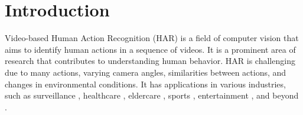 \documentclass[mathematics,article,submit,pdftex,moreauthors]{Definitions/mdpi}
\begin{document}



\section{Introduction}

Video-based Human Action Recognition (HAR) is a field of computer vision that aims to identify human actions in a sequence of videos. It is a prominent area of research \cite{Luo2023-xq} that contributes to understanding human behavior. HAR is challenging due to many actions, varying camera angles, similarities between actions, and changes in environmental conditions. It has applications in various industries, such as surveillance \cite{9506554}, healthcare \cite{GONCALVES2023120288}, eldercare \cite{9324837}, sports \cite{Luo2023-xq,niu2021}, entertainment \cite{highfive}, and beyond \cite{YU2024126827}.
\end{document}
